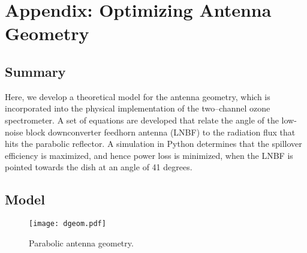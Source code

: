 \documentclass[11pt]{article}
\begin{document}
\section{Appendix: Optimizing Antenna Geometry}\label{AGEOMAP}
\subsection{Summary}
Here, we develop a theoretical model for the antenna geometry, which is incorporated into the physical implementation of the two--channel ozone spectrometer. A set of equations are developed that relate the angle of the low-noise block downconverter feedhorn antenna (LNBF) to the radiation flux that hits the parabolic reflector. A simulation in Python determines that the spillover efficiency is maximized, and hence power loss is minimized, when the LNBF is pointed towards the dish at an angle of 41 degrees.
\subsection{Model}
	\begin{figure}[h!]
		\centering
		\texttt{[image: dgeom.pdf]}
		\caption{Parabolic antenna geometry.}
		\label{A}
	\end{figure}
	
\end{document}
